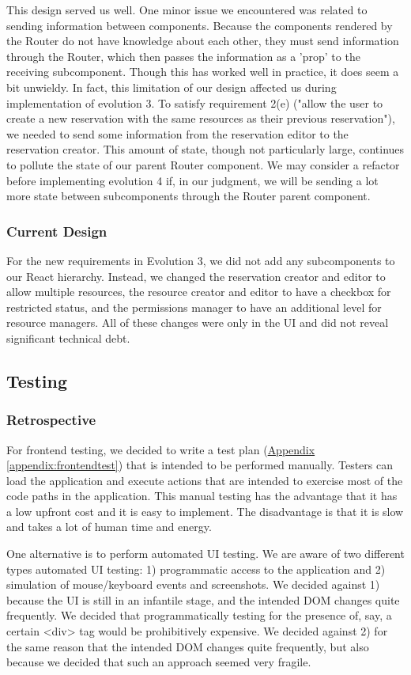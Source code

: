 \documentclass[12pt]{article}
\begin{document}
This design served us well. One minor issue we encountered was related to sending information between components. Because the components rendered by the Router do not have knowledge about each other, they must send information through the Router, which then passes the information as a 'prop' to the receiving subcomponent. Though this has worked well in practice, it does seem a bit unwieldy. In fact, this limitation of our design affected us during implementation of evolution 3. To satisfy requirement 2(e) ("allow the user to create a new reservation with the same resources as their previous reservation"), we needed to send some information from the reservation editor to the reservation creator. This amount of state, though not particularly large, continues to pollute the state of our parent Router component. We may consider a refactor before implementing evolution 4 if, in our judgment, we will be sending a lot more state between subcomponents through the Router parent component.

\subsubsection{Current Design}
For the new requirements in Evolution 3, we did not add any subcomponents to our React hierarchy. Instead, we changed the reservation creator and editor to allow multiple resources, the resource creator and editor to have a checkbox for restricted status, and the permissions manager to have an additional level for resource managers. All of these changes were only in the UI and did not reveal significant technical debt.

\subsection{Testing}
\subsubsection{Retrospective}
For frontend testing, we decided to write a test plan (\hyperref[appendix:frontendtest]{Appendix \ref{appendix:frontendtest}}) that is intended to be performed manually. Testers can load the application and execute actions that are intended to exercise most of the code paths in the application. This manual testing has the advantage that it has a low upfront cost and it is easy to implement. The disadvantage is that it is slow and takes a lot of human time and energy.

One alternative is to perform automated UI testing. We are aware of two different types automated UI testing: 1) programmatic access to the application and 2) simulation of mouse/keyboard events and screenshots. We decided against 1) because the UI is still in an infantile stage, and the intended DOM changes quite frequently. We decided that programmatically testing for the presence of, say, a certain <div> tag would be prohibitively expensive. We decided against 2) for the same reason that the intended DOM changes quite frequently, but also because we decided that such an approach seemed very fragile.
\end{document}
